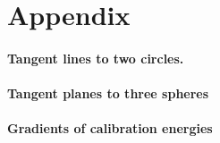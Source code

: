 \section{Appendix}

\paragraph{Tangent lines to two circles.}
\label{app:pillcorr}
% 

\paragraph{Tangent planes to three spheres}
\label{app:wedgecorr}
% 

\paragraph{Gradients of calibration energies}
\label{app:gradients}
% 


